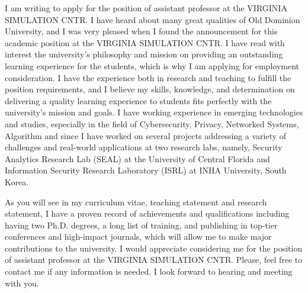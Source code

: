 \documentclass[10pt,stdletter]{newlfm}
\newcommand{\univ}{Old Dominion University}
\newcommand{\dept}{VIRGINIA SIMULATION CNTR}
\begin{document}
\begin{newlfm}

I am writing to apply for the position of assistant professor at the \dept. 
I have heard about many great qualities of \univ, and I was very pleased when I found the announcement for this academic position at the \dept.  
I have read with interest the university’s philosophy and mission on providing an outstanding learning experience for the students, which is why I am applying for employment consideration.  
I have the experience both in research and teaching to fulfill the position requirements, and I believe my skills, knowledge, and determination on delivering a quality learning experience to students fits perfectly with the university’s mission and goals. 
I have working experience in emerging technologies and studies, especially in the field of Cybersecurity, Privacy, Networked Systems, Algorithm and since I have worked on several projects addressing a variety of challenges and real-world applications at two research labs, namely, Security Analytics Research Lab (SEAL) at the University of Central Florida and Information Security Research Laboratory (ISRL) at INHA University, South Korea.

As you will see in my curriculum vitae, teaching statement and research statement, I have a proven record of achievements and qualifications including having two Ph.D. degrees, a long list of training, and publishing in top-tier conferences and high-impact journals, which will allow me to make major contributions to the university. I would appreciate considering me for the position of assistant professor at the \dept. Please, feel free to contact me if any information is needed. I look forward to hearing and meeting with you.

\end{newlfm}
\end{document}
